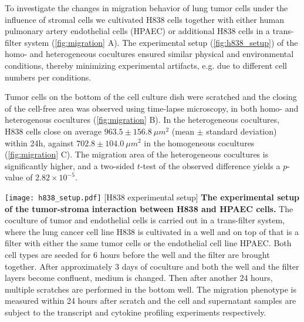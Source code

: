 To investigate the changes in migration behavior of lung tumor cells under the 
influence of stromal cells we cultivated  
H838 cells  together with either human pulmonary artery endothelial cells (HPAEC) or additional H838 cells in a trans-filter system (\ref{fig:migration} A).
The experimental setup (\ref{fig:h838_setup}) of the homo- and heterogeneous cocultures ensured 
similar physical and environmental conditions, thereby minimizing 
experimental artifacts, e.g. due to different cell numbers per conditions. 

Tumor cells on the bottom of the cell culture dish were scratched and the 
closing of the cell-free area was observed using time-lapse microscopy, in both
homo- and heterogenous cocultures (\ref{fig:migration} B).
In the heterogeneous cocultures, 
H838 cells close on average $963.5\pm156.8\ \mu m^2$ 
(mean $\pm$ standard deviation) within 24h, 
against $702.8\pm104.0\ \mu m^2$ in the homogeneous cocultures 
(\ref{fig:migration} C). 
The migration area of the heterogeneous cocultures is significantly higher, and
a two-sided  $t$-test of the observed difference yields a 
$p$-value of 
$2.82 \times 10^{-5}$.

\begin{center}
\captionsetup{labelformat=prepage}
\texttt{[image: h838\_setup.pdf]}
\newpage
[H838 experimental setup]{
{\bf The experimental setup of the tumor-stroma interaction 
between H838 and HPAEC cells.} 
The coculture of tumor and endothelial cells is carried out
in a trans-filter system, where the lung cancer cell line
H838 is cultivated in a well and on top of that is a filter
with either the same tumor cells or the endothelial cell
line HPAEC. Both cell types are seeded for 6 hours before 
the well and the filter are brought together. After 
approximately 3 days of coculture and both the well and the 
filter layers become confluent, medium is changed. Then
after another 24 hours, multiple scratches are performed
in the bottom well. The migration phenotype is measured within
24 hours after scratch and the cell and supernatant samples 
are subject to the transcript and cytokine profiling 
experiments respectively.
}
\label{fig:h838_setup}
\end{center}

